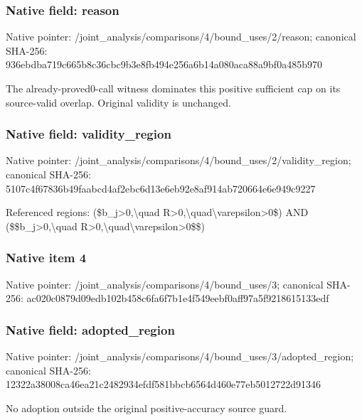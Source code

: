 \documentclass[10pt,a4paper]{article}
\begin{document}
\subsubsection{Native field: reason}
Native pointer: /joint\_\allowbreak{}analysis/comparisons/4/bound\_\allowbreak{}uses/2/reason; canonical SHA-256: 936ebdba719c665b8c36cbc9b3e8fb494e256a6b14a080aca88a9bf0a485b970

\begingroup\raggedright\sloppy The already-proved0-call witness dominates this positive sufficient cap on its source-valid overlap. Original validity is unchanged.\par\endgroup

\subsubsection{Native field: validity\_\allowbreak{}region}
Native pointer: /joint\_\allowbreak{}analysis/comparisons/4/bound\_\allowbreak{}uses/2/validity\_\allowbreak{}region; canonical SHA-256: 5107c4f67836b49faabcd4af2ebc6d13e6eb92e8af914ab720664e6e949c9227

\begingroup\raggedright\sloppy Referenced regions:\allowbreak{} (\$b\_\allowbreak{}j>0,\allowbreak{}\textbackslash{}quad R>0,\allowbreak{}\textbackslash{}quad\textbackslash{}varepsilon>0\$) AND (\$\$b\_\allowbreak{}j>0,\allowbreak{}\textbackslash{}quad R>0,\allowbreak{}\textbackslash{}quad\textbackslash{}varepsilon>0\$\$)\par\endgroup

\subsubsection{Native item 4}
Native pointer: /joint\_\allowbreak{}analysis/comparisons/4/bound\_\allowbreak{}uses/3; canonical SHA-256: ac020c0879d09edb102b458c6fa6f7b1e4f549eebf0aff97a5f9218615133edf

\subsubsection{Native field: adopted\_\allowbreak{}region}
Native pointer: /joint\_\allowbreak{}analysis/comparisons/4/bound\_\allowbreak{}uses/3/adopted\_\allowbreak{}region; canonical SHA-256: 12322a38008ca46ea21c2482934efdf581bbcb6564d460e77eb5012722d91346

\begingroup\raggedright\sloppy No adoption outside the original positive-accuracy source guard.\par\endgroup
\end{document}
